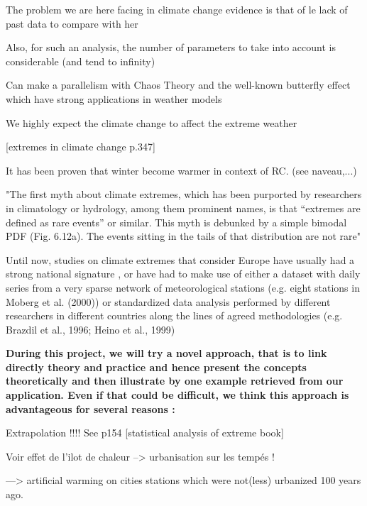 \documentclass[11pt,a4paper,openany ]{book}
\begin{document}
The problem we are here facing in climate change evidence is that of le lack of past data to compare with her

Also, for such an analysis, the number of parameters to take into account is considerable (and tend to infinity)  

Can make a parallelism with Chaos Theory and the well-known butterfly effect which have strong applications in weather models\newline

We highly expect the climate change to affect the extreme weather  \newline

[extremes in climate change p.347]


It has been proven that winter become warmer in context of RC. (see naveau,...)


\cite{kharin_changes_2006}


"The first myth about climate extremes, which has been purported by
researchers in climatology or hydrology, among them prominent names, is that
“extremes are defined as rare events” or similar. This myth is debunked by a simple
bimodal PDF (Fig. 6.12a). The events sitting in the tails of that distribution are not
rare" \cite[pp.257]{mudelsee_climate_2014}
\newline

Until now, studies on climate extremes that consider Europe have usually had a strong national signature
, or have had to make use of either a
dataset with daily series from a very sparse network of meteorological stations (e.g. eight stations in Moberg
et al. (2000)) or standardized data analysis performed by different researchers in different countries along the
lines of agreed methodologies (e.g. Brazdil et al., 1996; Heino et al., 1999) \cite{klein_tank_daily_2002}

\textbf{During this project, we will try a novel approach, that is to link directly theory and practice and hence present the concepts theoretically and then illustrate by one example retrieved from our application. Even if that could be difficult, we think this approach is advantageous for several reasons :} 

Extrapolation !!!! See p154 [statistical analysis of extreme book]



Voir effet de l'ilot de chaleur --> urbanisation sur les tempés !

---> artificial warming on cities stations which were not(less) urbanized 100 years ago.
\end{document}
